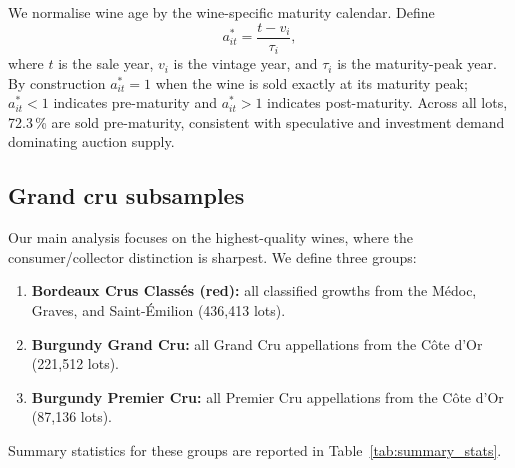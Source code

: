 We normalise wine age by the wine-specific maturity calendar. Define
\begin{equation}
  a_{it}^* = \frac{t - v_i}{\tau_i},
  \label{eq:age_norm}
\end{equation}
where $t$ is the sale year, $v_i$ is the vintage year, and $\tau_i$ is the maturity-peak
year. By construction $a_{it}^* = 1$ when the wine is sold exactly at its maturity peak;
$a_{it}^* < 1$ indicates pre-maturity and $a_{it}^* > 1$ indicates post-maturity. Across
all lots, 72.3\,\% are sold pre-maturity, consistent with speculative and investment demand
dominating auction supply.

\subsection{Grand cru subsamples}

Our main analysis focuses on the highest-quality wines, where the consumer/collector distinction
is sharpest. We define three groups:

\begin{enumerate}
  \item \textbf{Bordeaux Crus Classés (red):} all classified growths from the Médoc, Graves,
        and Saint-Émilion (436,413 lots).
  \item \textbf{Burgundy Grand Cru:} all Grand Cru appellations from the Côte d'Or (221,512 lots).
  \item \textbf{Burgundy Premier Cru:} all Premier Cru appellations from the Côte d'Or
        (87,136 lots).
\end{enumerate}

Summary statistics for these groups are reported in Table~\ref{tab:summary_stats}.
